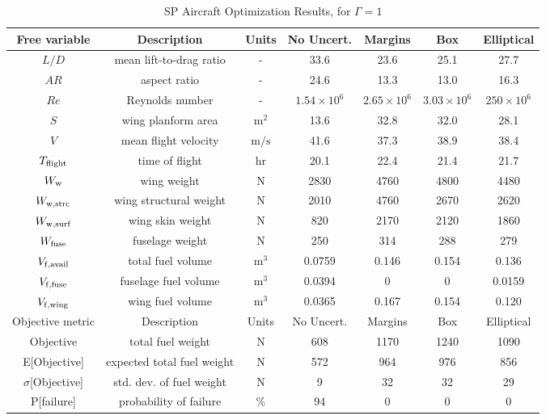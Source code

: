 \begin{table}[!h]
\begin{center}
\caption{\label{tab:results} SP Aircraft Optimization Results, for $\Gamma = 1$}
\begin{tabular}{c c c c c c c}
\hline
Free variable & Description & Units & No Uncert. & Margins & Box & Elliptical \\
\hline
$L/D$ & mean lift-to-drag ratio & - & 33.6 & 23.6 & 25.1 & 27.7 \\
$AR$ & aspect ratio & - & 24.6 & 13.3 & 13.0 & 16.3 \\
$Re$ & Reynolds number & - & $1.54 \times 10^6$ & $2.65 \times 10^6$ & $3.03\times 10^6$ & $250 \times 10^6$ \\
$S$ & wing planform area &$\mathrm{m^2}$ & 13.6 & 32.8 & 32.0 & 28.1 \\
$V$ & mean flight velocity &$\mathrm{m/s}$ & 41.6 & 37.3 & 38.9 & 38.4 \\
$T_{\rm{flight}}$ & time of flight & $\mathrm{hr}$ & 20.1 & 22.4 & 21.4 & 21.7 \\
$W_{\rm{w}}$ & wing weight & $\mathrm{N}$ & 2830 & 4760 & 4800 & 4480 \\
$W_{\rm{w,strc}}$ & wing structural weight &$\mathrm{N}$ & 2010 & 4760 & 2670 & 2620 \\
$W_{\rm{w,surf}}$ & wing skin weight &$\mathrm{N}$ & 820 & 2170 & 2120 & 1860 \\
$W_{\rm{fuse}}$ & fuselage weight &$\mathrm{N}$ & 250 & 314 & 288 & 279 \\
$V_{\rm{f,avail}}$ & total fuel volume & $\mathrm{m^3}$ & 0.0759 & 0.146 & 0.154 & 0.136 \\
$V_{\rm{f,fuse}}$ & fuselage fuel volume & $\mathrm{m^3}$ & 0.0394 & 0 & 0 & 0.0159 \\
$V_{\rm{f,wing}}$ & wing fuel volume &$\mathrm{m^3}$ & 0.0365 & 0.167 & 0.154 & 0.120    \\
\hline
Objective metric & Description & Units & No Uncert. & Margins & Box & Elliptical \\
\hline
Objective & total fuel weight & $\mathrm{N}$ & 608 & 1170 & 1240 & 1090 \\
\hline
E[Objective] & expected total fuel weight & $\mathrm{N}$ & 572 & 964 & 976 & 856 \\
\hline
$\sigma$[Objective] & std. dev. of fuel weight & $\mathrm{N}$ & 9 & 32 & 32 & 29 \\
\hline
P[failure] & probability of failure & \% & 94 & 0 & 0 & 0\\
\hline
\end{tabular}
\end{center}
\end{table}

